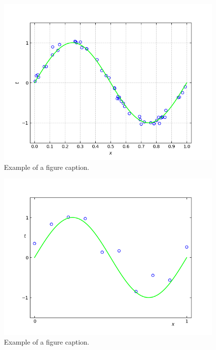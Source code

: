 \documentclass[conference]{IEEEtran}
\begin{document}
\begin{figure}[p!]
\centerline{\includegraphics[trim=20 0 40 0, clip, width=\columnwidth]{Figure_5.png}}
\caption{Example of a figure caption.}
\label{fig:noisysingen}
\end{figure}

\begin{figure}[p!]
\centerline{\includegraphics[trim=20 0 40 0, clip, width=\columnwidth]{Figure_6.png}}
\caption{Example of a figure caption.}
\label{fig:noisysinfile}
\end{figure}
\end{document}
